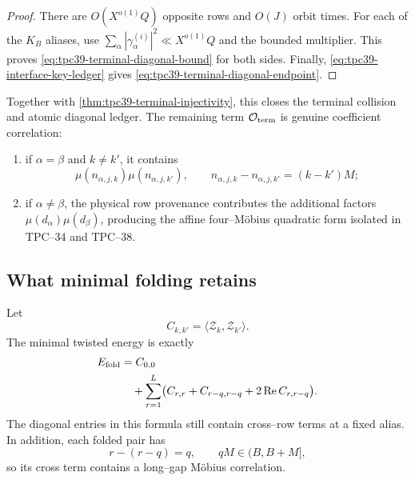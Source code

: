 \begin{proof}
There are \(O(X^{o(1)}Q)\) opposite rows and \(O(J)\) orbit times.
For each of the \(K_B\) aliases, use
\(\sum_\alpha|\gamma_\alpha^{(i)}|^2\ll X^{o(1)}Q\) and the bounded
multiplier.  This proves
\eqref{eq:tpc39-terminal-diagonal-bound} for both sides.  Finally,
\eqref{eq:tpc39-interface-key-ledger} gives
\eqref{eq:tpc39-terminal-diagonal-endpoint}.
\end{proof}

Together with \cref{thm:tpc39-terminal-injectivity}, this closes the
terminal collision and atomic diagonal ledger.  The remaining term
\(\mathcal O_{\rm term}\) is genuine coefficient correlation:
\begin{enumerate}[label=(\roman*)]
 \item if \(\alpha=\beta\) and \(k\ne k'\), it contains
 \begin{equation}
  \mu(n_{\alpha,j,k})\mu(n_{\alpha,j,k'}),
  \qquad
  n_{\alpha,j,k}-n_{\alpha,j,k'}=(k-k')M;
  \label{eq:tpc39-terminal-two-Mobius}
 \end{equation}
 \item if \(\alpha\ne\beta\), the physical row provenance contributes
 the additional factors \(\mu(d_\alpha)\mu(d_\beta)\), producing the
 affine four--M\"obius quadratic form isolated in TPC--34 and TPC--38.
\end{enumerate}

\subsection{What minimal folding retains}

Let
\begin{equation}
 C_{k,k'}=\langle\mathscr Z_k,\mathscr Z_{k'}\rangle.
 \label{eq:tpc39-alias-covariance}
\end{equation}
The minimal twisted energy is exactly
\begin{align}
 E_{\rm fold}
 &=C_{0,0}
 \notag\\
 &\quad+
 \sum_{r=1}^{L}
 \bigl(
 C_{r,r}+C_{r-q,r-q}
 +2\operatorname{Re}C_{r,r-q}
 \bigr).
 \label{eq:tpc39-terminal-folded-covariance}
\end{align}
The diagonal entries in this formula still contain cross--row terms at a
fixed alias.  In addition, each folded pair has
\begin{equation}
 r-(r-q)=q,
 \qquad qM\in(B,B+M],
 \label{eq:tpc39-terminal-long-gap}
\end{equation}
so its cross term contains a long--gap M\"obius correlation.

